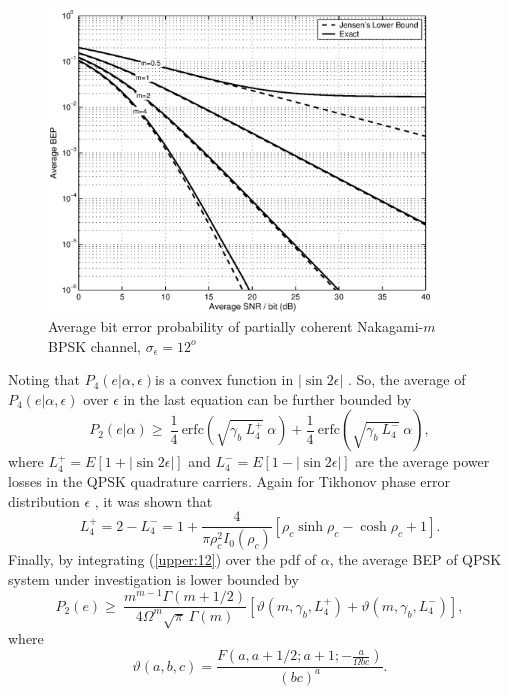 \begin{figure}[tbp]
\centerline{\includegraphics[width=4in]{./upper001.eps}} 
\caption[]
{Average bit error probability of partially coherent Nakagami-$m$ BPSK channel, $\sigma_\epsilon=12^o$}
\end{figure}
 Noting that $P_4(e|\alpha,\epsilon)$is a convex function in $|\sin2\epsilon|$ . So, the
average of $P_4(e|\alpha,\epsilon)$ over $\epsilon$ in the last
equation can be further bounded by
\begin{equation}
\label{upper:12} P_2(e|\alpha)\ge ~\frac{1}{4}~\mbox{erfc} \left(
\sqrt{\gamma_b~L_4^+}~ \alpha\right)+\frac{1}{4}~\mbox{erfc}
\left( \sqrt{\gamma_b~L_4^-}~ \alpha \right),
\end{equation}
where $L_4^+=E\left[1+|\sin2\epsilon|\right]$  and
$L_4^-=E\left[1-|\sin2\epsilon|\right]$ are the average power
losses in the QPSK quadrature carriers. Again for Tikhonov phase
error distribution $\epsilon$ , it was shown that \cite{najib:98}
\begin{equation}
\label{upper:13} L_4^+=2-L_4^-=1+\frac{4}{\pi\rho_c^2
I_0(\rho_c)}\left[\rho_c \sinh\rho_c-\cosh\rho_c+1\right].
\end{equation}
Finally, by integrating (\ref{upper:12}) over the pdf of $\alpha$,
the average BEP of QPSK system under investigation is lower
bounded by
\begin{equation}
\label{upper:14}
P_2(e)\ge~\frac{m^{m-1}\Gamma(m+1/2)}{4\Omega^m\sqrt\pi~\Gamma(m)}\left[\vartheta(m,\gamma_b,L_4^+)
+\vartheta(m,\gamma_b,L_4^-)\right],
\end{equation}
where
\begin{equation}
\label{upper:15}
\vartheta(a,b,c)=\frac{F\left(a,a+1/2;a+1;-\frac{a}{\Omega
bc}\right)}{(bc)^a}.
\end{equation}

